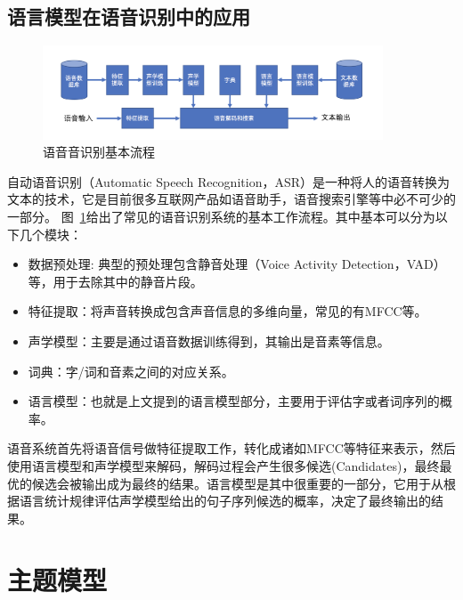 \subsection{语言模型在语音识别中的应用}

\begin{figure}[h!]
	\begin{center}
		\includegraphics[width=0.9\textwidth]{img/chapter_lm/asr-pipeline2.png}
		\caption{语音音识别基本流程}
		\label{pic:asr}
	\end{center}
\end{figure}

自动语音识别（Automatic Speech Recognition，ASR）是一种将人的语音转换为文本的技术，它是目前很多互联网产品如语音助手，语音搜索引擎等中必不可少的一部分。
图~\ref{pic:asr}给出了常见的语音识别系统的基本工作流程。其中基本可以分为以下几个模块：
\begin{itemize}
    \item 数据预处理: 典型的预处理包含静音处理（Voice Activity Detection，VAD）等，用于去除其中的静音片段。
	\item 特征提取：将声音转换成包含声音信息的多维向量，常见的有MFCC等。
	\item 声学模型：主要是通过语音数据训练得到，其输出是音素等信息。
	\item 词典：字/词和音素之间的对应关系。
	\item 语言模型：也就是上文提到的语言模型部分，主要用于评估字或者词序列的概率。
\end{itemize}

\noindent 语音系统首先将语音信号做特征提取工作，转化成诸如MFCC等特征来表示，然后使用语言模型和声学模型来解码，解码过程会产生很多候选(Candidates)，最终最优的候选会被输出成为最终的结果。语言模型是其中很重要的一部分，它用于从根据语言统计规律评估声学模型给出的句子序列候选的概率，决定了最终输出的结果。 
\section{主题模型}

